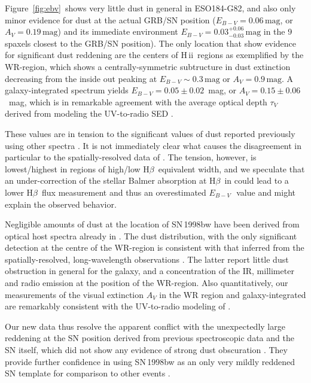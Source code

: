 \documentclass[traditabstract]{aa}
\newcommand{\hb}{H$\beta$}
\newcommand{\hii}{\mbox{H\,{\sc ii}}}
\newcommand{\ebv}{$E_{B-V}\,$}
\begin{document}
Figure~\ref{fig:ebv}~shows very little dust in general in ESO184-G82, and also only minor evidence for dust at the actual GRB/SN position ($E_{B-V} = 0.06\,\mathrm{mag}$, or $A_V = 0.19\,\mathrm{mag}$) and its immediate environment $E_{B-V} = 0.03_{-0.03}^{+0.06}\,\mathrm{mag}$ in the 9 spaxels closest to the GRB/SN position). The only location that show evidence for significant dust reddening are the centers of \hii\, regions as exemplified by the WR-region, which shows a centrally-symmetric subtructure in dust extinction decreasing from the inside out peaking at $E_{B-V} \sim 0.3\,\mathrm{mag}$ or $A_V = 0.9\,\mathrm{mag}$. A galaxy-integrated spectrum yields $E_{B-V} = 0.05\pm0.02$~mag, or $A_V=0.15\pm0.06$~mag, which is in remarkable agreement with the average optical depth $\tau_V$ derived from modeling the UV-to-radio SED \citep{2014A&A...562A..70M}.

These values are in tension to the significant values of dust reported previously using other spectra \citep{2006A&A...454..103H, 2008A&A...490...45C, 2009ApJ...691..182S}. It is not immediately clear what causes the disagreement in particular to the spatially-resolved data of \citet{2008A&A...490...45C}. The tension, however, is lowest/highest in regions of high/low \hb\, equivalent width, and we speculate that an under-correction of the stellar Balmer absorption at \hb\, in \citet{2008A&A...490...45C} could lead to a lower \hb\, flux measurement and thus an overestimated \ebv~value and might explain the observed behavior.

Negligible amounts of dust at the location of SN\,1998bw have been derived from optical host spectra already in \citet{2005NewA...11..103S}. The dust distribution, with the only significant detection at the centre of the WR-region is consistent with that inferred from the spatially-resolved, long-wavelength observations \citep{2014A&A...562A..70M}. The latter report little dust obstruction in general for the galaxy, and a concentration of the IR, millimeter and radio emission at the position of the WR-region. Also quantitatively, our measurements of the visual extinction $A_V$ in the WR region and galaxy-integrated are remarkably consistent with the UV-to-radio modeling of \citet{2014A&A...562A..70M}.

Our new data thus resolve the apparent conflict with the unexpectedly large reddening at the SN position derived from previous spectroscopic data \citep{2006A&A...454..103H, 2008A&A...490...45C} and the SN itself, which did not show any evidence of strong dust obscuration \citep[e.g.,][]{1998Natur.395..672I, 2001ApJ...555..900P}. They provide further confidence in using SN\,1998bw as an only very mildly reddened SN template for comparison to other events \citep[e.g.,][and numerous references therein]{2004ApJ...609..952Z, 2016arXiv160606791K}.
\end{document}
